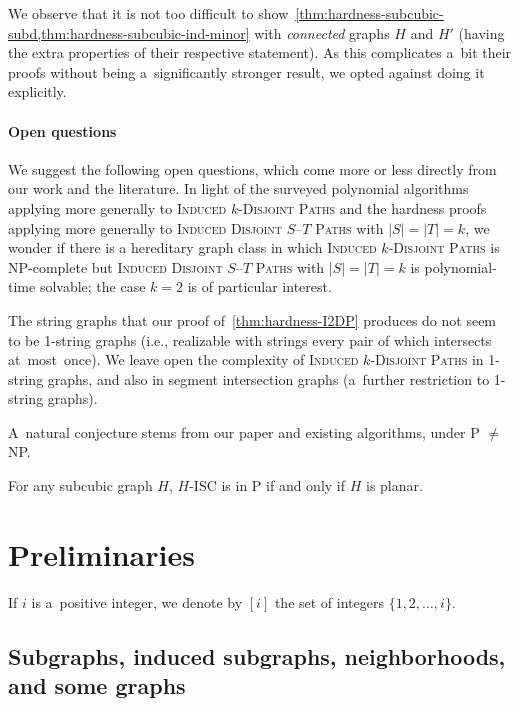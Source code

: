 \documentclass[a4paper,UKenglish,cleveref,autoref]{lipics-v2021}
\begin{document}
We observe that it is not too difficult to show~\cref{thm:hardness-subcubic-subd,thm:hardness-subcubic-ind-minor} with \emph{connected} graphs $H$ and $H'$ (having the extra properties of their respective statement).
As this complicates a~bit their proofs without being a~significantly stronger result, we opted against doing it explicitly.

\paragraph*{Open questions}

We suggest the following open questions, which come more or less directly from our work and the literature.
In light of the surveyed polynomial algorithms applying more generally to \textsc{Induced $k$-Disjoint Paths} and the hardness proofs applying more generally to \textsc{Induced Disjoint $S$--$T$ Paths} with $|S|=|T|=k$, we wonder if there is a hereditary graph class in which \textsc{Induced $k$-Disjoint Paths} is NP-complete but \textsc{Induced Disjoint $S$--$T$ Paths} with $|S|=|T|=k$ is polynomial-time solvable; the case $k=2$ is of particular interest.  

The string graphs that our proof of~\cref{thm:hardness-I2DP} produces do not seem to be 1-string graphs (i.e., realizable with strings every pair of which intersects at~most~once).
We leave open the complexity of \textsc{Induced $k$-Disjoint Paths} in 1-string graphs, and also in segment intersection graphs (a~further restriction to 1-string graphs).

A~natural conjecture stems from our paper and existing algorithms, under P $\neq$ NP.
\begin{conjecture}\label{conj:subcubic-subd-planar}
 For any subcubic graph $H$, \textsc{$H$-ISC} is in P if and only if $H$ is planar.
\end{conjecture}

\section{Preliminaries}

If $i$ is a~positive integer, we denote by $[i]$ the set of integers $\{1,2,\ldots,i\}$.

\subsection{Subgraphs, induced subgraphs, neighborhoods, and some graphs}\label{sec:graph-def}
\end{document}
